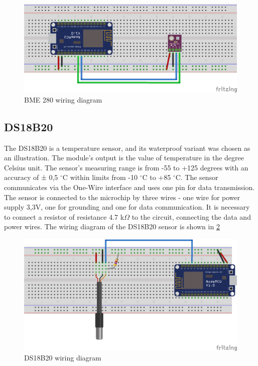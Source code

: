 \begin{figure}[H]
	\centering
	\includegraphics[width=\textwidth]{img/bme280_schema.png}
	\caption{BME 280 wiring diagram}
	\label{fig:bme280_schema}
\end{figure}


\subsection{DS18B20}

The DS18B20 \citep{DS18B20_Datasheet} is a temperature sensor, and its waterproof variant was chosen as an illustration.  The module's output is the value of temperature in the degree Celsius unit. The sensor's measuring range is from -55 to +125 degrees with an accuracy of ± 0,5 $^{\circ}$C within limits from -10 $^{\circ}$C to +85 $^{\circ}$C. The sensor communicates via the One-Wire interface and uses one pin for data transmission. The sensor is connected to the microchip by three wires - one wire for power supply 3,3V, one for grounding and one for data communication. It is necessary to connect a resistor of resistance 4.7 k$\Omega$ to the circuit, connecting the data and power wires. The wiring diagram of the DS18B20 sensor is shown in \cref{fig:ds18b20_schema}

\begin{figure}[H]
	\centering
	\includegraphics[width=\textwidth]{img/ds18b20_schema.png}
	\caption{DS18B20 wiring diagram}
	\label{fig:ds18b20_schema}
\end{figure}

